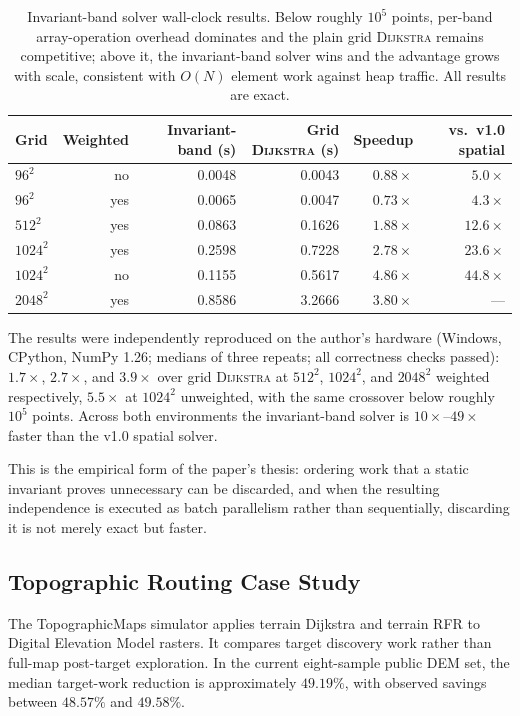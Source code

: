 \documentclass[11pt]{article}
\newcommand{\RFR}{\textsc{RFR}}
\newcommand{\Dijkstra}{\textsc{Dijkstra}}
\begin{document}
\begin{table}[htbp]
\centering
\begin{tabular}{lrrrrr}
\toprule
Grid & Weighted & Invariant-band (s) & Grid \Dijkstra{} (s) & Speedup & vs.\ v1.0 spatial \\
\midrule
$96^2$   & no  & 0.0048 & 0.0043 & $0.88\times$ & $5.0\times$ \\
$96^2$   & yes & 0.0065 & 0.0047 & $0.73\times$ & $4.3\times$ \\
$512^2$  & yes & 0.0863 & 0.1626 & $1.88\times$ & $12.6\times$ \\
$1024^2$ & yes & 0.2598 & 0.7228 & $2.78\times$ & $23.6\times$ \\
$1024^2$ & no  & 0.1155 & 0.5617 & $4.86\times$ & $44.8\times$ \\
$2048^2$ & yes & 0.8586 & 3.2666 & $3.80\times$ & --- \\
\bottomrule
\end{tabular}
\caption{Invariant-band solver wall-clock results. Below roughly $10^5$ points, per-band array-operation overhead dominates and the plain grid \Dijkstra{} remains competitive; above it, the invariant-band solver wins and the advantage grows with scale, consistent with $O(N)$ element work against heap traffic. All results are exact.}
\label{tab:invariantresults}
\end{table}

The results were independently reproduced on the author's hardware (Windows, CPython, NumPy 1.26; medians of three repeats; all correctness checks passed): $1.7\times$, $2.7\times$, and $3.9\times$ over grid \Dijkstra{} at $512^2$, $1024^2$, and $2048^2$ weighted respectively, $5.5\times$ at $1024^2$ unweighted, with the same crossover below roughly $10^5$ points. Across both environments the invariant-band solver is $10\times$--$49\times$ faster than the v1.0 spatial solver.

This is the empirical form of the paper's thesis: ordering work that a static invariant proves unnecessary can be discarded, and when the resulting independence is executed as batch parallelism rather than sequentially, discarding it is not merely exact but faster.

\subsection{Topographic Routing Case Study}

The TopographicMaps simulator applies terrain Dijkstra and terrain \RFR{} to Digital Elevation Model rasters. It compares target discovery work rather than full-map post-target exploration. In the current eight-sample public DEM set, the median target-work reduction is approximately $49.19\%$, with observed savings between $48.57\%$ and $49.58\%$.
\end{document}
